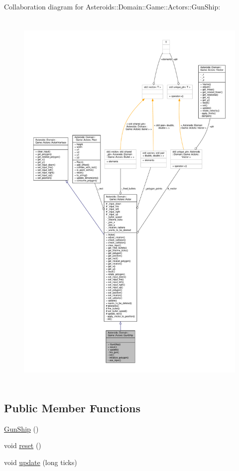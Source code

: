 Collaboration diagram for Asteroids\+:\+:Domain\+:\+:Game\+:\+:Actors\+:\+:Gun\+Ship\+:\nopagebreak
\begin{figure}[H]
\begin{center}
\leavevmode
\includegraphics[height=550pt]{classAsteroids_1_1Domain_1_1Game_1_1Actors_1_1GunShip__coll__graph}
\end{center}
\end{figure}
\subsection*{Public Member Functions}
\begin{DoxyCompactItemize}
\item 
\hyperlink{classAsteroids_1_1Domain_1_1Game_1_1Actors_1_1GunShip_a4e6a5de697b5a88bf3942165397cd27b}{Gun\+Ship} ()
\item 
void \hyperlink{classAsteroids_1_1Domain_1_1Game_1_1Actors_1_1GunShip_a753c275a7840962c92cfe4843bcbd6ac}{reset} ()
\item 
void \hyperlink{classAsteroids_1_1Domain_1_1Game_1_1Actors_1_1GunShip_a4b37d42d9758c701d75e6a91dda71a5b}{update} (long ticks)
\end{DoxyCompactItemize}

